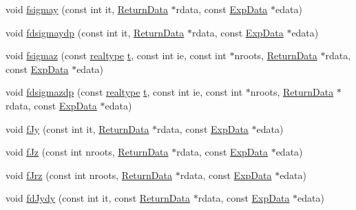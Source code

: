 \begin{DoxyCompactItemize}
\item 
void \mbox{\hyperlink{classamici_1_1_model_af729c798cfe341d7bef0ecba62800dd7}{fsigmay}} (const int it, \mbox{\hyperlink{classamici_1_1_return_data}{Return\+Data}} $\ast$rdata, const \mbox{\hyperlink{classamici_1_1_exp_data}{Exp\+Data}} $\ast$edata)
\item 
void \mbox{\hyperlink{classamici_1_1_model_acd0838d3644e9232cc2e65d7a8c956cf}{fdsigmaydp}} (const int it, \mbox{\hyperlink{classamici_1_1_return_data}{Return\+Data}} $\ast$rdata, const \mbox{\hyperlink{classamici_1_1_exp_data}{Exp\+Data}} $\ast$edata)
\item 
void \mbox{\hyperlink{classamici_1_1_model_a55798a44d65a15c907e74f4738efb994}{fsigmaz}} (const \mbox{\hyperlink{namespaceamici_a1bdce28051d6a53868f7ccbf5f2c14a3}{realtype}} \mbox{\hyperlink{classamici_1_1_model_a711281d57e9710226face29151cc4641}{t}}, const int ie, const int $\ast$nroots, \mbox{\hyperlink{classamici_1_1_return_data}{Return\+Data}} $\ast$rdata, const \mbox{\hyperlink{classamici_1_1_exp_data}{Exp\+Data}} $\ast$edata)
\item 
void \mbox{\hyperlink{classamici_1_1_model_a0c9fd2d7e184d44745130d7ffa2a0075}{fdsigmazdp}} (const \mbox{\hyperlink{namespaceamici_a1bdce28051d6a53868f7ccbf5f2c14a3}{realtype}} \mbox{\hyperlink{classamici_1_1_model_a711281d57e9710226face29151cc4641}{t}}, const int ie, const int $\ast$nroots, \mbox{\hyperlink{classamici_1_1_return_data}{Return\+Data}} $\ast$rdata, const \mbox{\hyperlink{classamici_1_1_exp_data}{Exp\+Data}} $\ast$edata)
\item 
void \mbox{\hyperlink{classamici_1_1_model_ad8fd49506b1d288ded2c036318f3ca51}{f\+Jy}} (const int it, \mbox{\hyperlink{classamici_1_1_return_data}{Return\+Data}} $\ast$rdata, const \mbox{\hyperlink{classamici_1_1_exp_data}{Exp\+Data}} $\ast$edata)
\item 
void \mbox{\hyperlink{classamici_1_1_model_a00e31d4a939e96476f2dc67bc930054c}{f\+Jz}} (const int nroots, \mbox{\hyperlink{classamici_1_1_return_data}{Return\+Data}} $\ast$rdata, const \mbox{\hyperlink{classamici_1_1_exp_data}{Exp\+Data}} $\ast$edata)
\item 
void \mbox{\hyperlink{classamici_1_1_model_a82a8b0d0b20ab474f48e98776b6cb791}{f\+Jrz}} (const int nroots, \mbox{\hyperlink{classamici_1_1_return_data}{Return\+Data}} $\ast$rdata, const \mbox{\hyperlink{classamici_1_1_exp_data}{Exp\+Data}} $\ast$edata)
\item 
void \mbox{\hyperlink{classamici_1_1_model_a182dd2b4c7ad2fcfdc1987e0dfb8d5a4}{fd\+Jydy}} (const int it, const \mbox{\hyperlink{classamici_1_1_return_data}{Return\+Data}} $\ast$rdata, const \mbox{\hyperlink{classamici_1_1_exp_data}{Exp\+Data}} $\ast$edata)

\end{DoxyCompactItemize}
